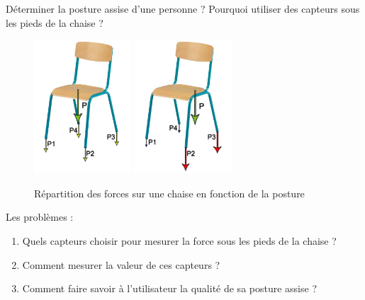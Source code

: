 \documentclass{beamer}
\begin{document}
\begin{frame}
\begin{block}{Déterminer la posture assise d'une personne ?}
Pourquoi utiliser des capteurs sous les pieds de la chaise ?
\begin{figure}
\begin{center}
\includegraphics[height=5cm]{images/Chaise_forces_homo.jpg}
\includegraphics[height=5cm]{images/Chaise_forces_hetero.jpg}
\end{center}
\caption{Répartition des forces sur une chaise en fonction de la posture}
\label{fig:chaise_repartition}
\end{figure}
\end{block}
\end{frame}


\begin{frame}
\begin{block}{Les problèmes :}
\begin{enumerate}
\item Quels capteurs choisir pour mesurer la force sous les pieds de la chaise ?
\item Comment mesurer la valeur de ces capteurs ?
\item Comment faire savoir à l'utilisateur la qualité de sa posture assise ?
\end{enumerate}
\end{block}
\end{frame}
\end{document}
